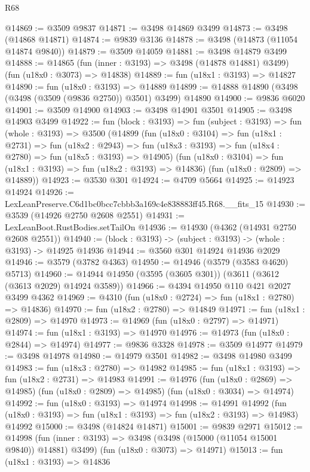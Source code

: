 \begin{lexlean}{R68}
\begin{coremodule}
@14869 := @3509 @9837
@14871 := @3498 @14869 @3499
@14873 := @3498 (@14868 @14871)
@14874 := @9839 @3136
@14878 := @3498 (@14873 (@11054 @14874 @9840))
@14879 := @3509 @14059
@14881 := @3498 @14879 @3499
@14888 := @14865
    (fun (inner : @3193) => @3498 (@14878 @14881) @3499)
    (fun (u18x0 : @3073) => @14838)
@14889 := fun (u18x1 : @3193) => @14827
@14890 := fun (u18x0 : @3193) => @14889
@14899 := @14888 @14890 (@3498 (@3498 (@3509 (@9836 @2750)) @3501) @3499) @14890
@14900 := @9836 @6020
@14901 := @3509 @14900
@14903 := @3498 @14901 @3501
@14905 := @3498 @14903 @3499
@14922 := fun (block : @3193) =>
  fun (subject : @3193) =>
  fun (whole : @3193) =>
  @3500
    (@14899
      (fun (u18x0 : @3104) =>
      fun (u18x1 : @2731) =>
      fun (u18x2 : @2943) =>
      fun (u18x3 : @3193) => fun (u18x4 : @2780) => fun (u18x5 : @3193) => @14905)
      (fun (u18x0 : @3104) => fun (u18x1 : @3193) => fun (u18x2 : @3193) => @14836)
      (fun (u18x0 : @2809) => @14889))
@14923 := @3530 @301
@14924 := @4709 @5664
@14925 := @14923 @14924
@14926 := LexLeanPreserve.C6d1bc0bcc7cbbb3a169c4e838883ff45.R68.__fits_15
@14930 := @3539 (@14926 @2750 @2608 @2551)
@14931 := LexLeanBoot.RustBodies.setTailOn
@14936 := @14930 (@4362 (@14931 @2750 @2608 @2551))
@14940 := (block : @3193) -> (subject : @3193) -> (whole : @3193) -> @14925 @14936
@14944 := @3560 @301 @14924 @14936 @2029
@14946 := @3579 (@3782 @4363)
@14950 := @14946 (@3579 (@3583 @4620) @5713)
@14960 := @14944 @14950 (@3595 (@3605 @301)) (@3611 (@3612 (@3613 @2029) @14924 @3589))
@14966 := @4394 @14950 @110 @421 @2027 @3499 @4362
@14969 := @4310 (fun (u18x0 : @2724) => fun (u18x1 : @2780) => @14836)
@14970 := fun (u18x2 : @2780) => @14849
@14971 := fun (u18x1 : @2809) => @14970
@14973 := @14969 (fun (u18x0 : @2797) => @14971)
@14974 := fun (u18x1 : @3193) => @14970
@14976 := @14973 (fun (u18x0 : @2844) => @14974)
@14977 := @9836 @3328
@14978 := @3509 @14977
@14979 := @3498 @14978
@14980 := @14979 @3501
@14982 := @3498 @14980 @3499
@14983 := fun (u18x3 : @2780) => @14982
@14985 := fun (u18x1 : @3193) => fun (u18x2 : @2731) => @14983
@14991 := @14976
    (fun (u18x0 : @2869) => @14985)
    (fun (u18x0 : @2809) => @14985)
    (fun (u18x0 : @3034) => @14974)
@14992 := fun (u18x0 : @3193) => @14974
@14998 := @14991
    @14992
    (fun (u18x0 : @3193) => fun (u18x1 : @3193) => fun (u18x2 : @3193) => @14983)
    @14992
@15000 := @3498 (@14824 @14871)
@15001 := @9839 @2971
@15012 := @14998
    (fun (inner : @3193) => @3498 (@3498 (@15000 (@11054 @15001 @9840)) @14881) @3499)
    (fun (u18x0 : @3073) => @14971)
@15013 := fun (u18x1 : @3193) => @14836

\end{coremodule}
\end{lexlean}
